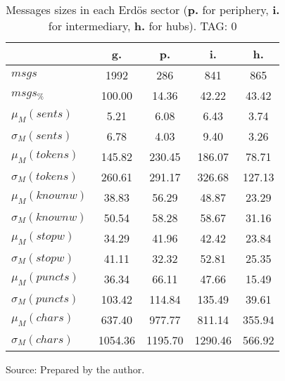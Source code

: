 \begin{table}[h!]
\begin{center}
	\caption{Messages sizes in each Erd\"os sector ({{\bf p.}} for periphery, {{\bf i.}} for intermediary, {{\bf h.}} for hubs). TAG: 0}\label{tab:sizesMsgs}
\begin{tabular}{| l || c | c | c | c |}\hline
 & {\bf g.} & {\bf p.} & {\bf i.} & {\bf h.} \\\hline\hline
$msgs$ & 1992  & 286  & 841  & 865 \\
$msgs_{\%}$ & 100.00  & 14.36  & 42.22  & 43.42 \\\hline
$\mu_M(sents)$ & 5.21  & 6.08  & 6.43  & 3.74 \\
$\sigma_M(sents)$ & 6.78  & 4.03  & 9.40  & 3.26 \\\hline
$\mu_M(tokens)$ & 145.82  & 230.45  & 186.07  & 78.71 \\
$\sigma_M(tokens)$ & 260.61  & 291.17  & 326.68  & 127.13 \\\hline
$\mu_M(knownw)$ & 38.83  & 56.29  & 48.87  & 23.29 \\
$\sigma_M(knownw)$ & 50.54  & 58.28  & 58.67  & 31.16 \\\hline
$\mu_M(stopw)$ & 34.29  & 41.96  & 42.42  & 23.84 \\
$\sigma_M(stopw)$ & 41.11  & 32.32  & 52.81  & 25.35 \\\hline
$\mu_M(puncts)$ & 36.34  & 66.11  & 47.66  & 15.49 \\
$\sigma_M(puncts)$ & 103.42  & 114.84  & 135.49  & 39.61 \\\hline
$\mu_M(chars)$ & 637.40  & 977.77  & 811.14  & 355.94 \\
$\sigma_M(chars)$ & 1054.36  & 1195.70  & 1290.46  & 566.92 \\\hline
\end{tabular}
\begin{flushleft}
		Source: Prepared by the author.\
\end{flushleft}
\end{center}
\end{table}
